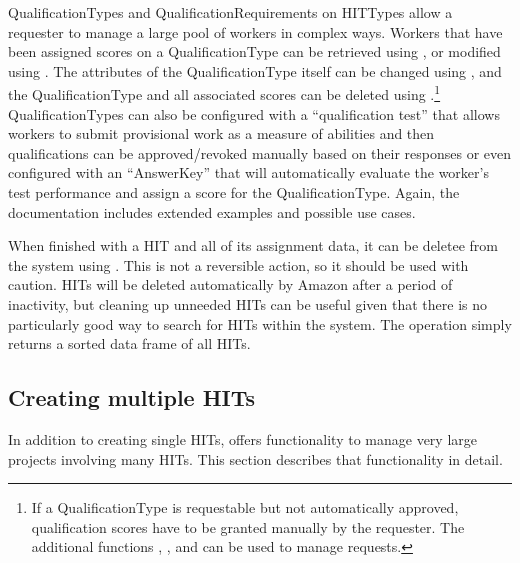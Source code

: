 QualificationTypes and QualificationRequirements on HITTypes allow a
requester to manage a large pool of workers in complex ways. Workers
that have been assigned scores on a QualificationType can be retrieved
using , or modified using
. The attributes of the
QualificationType itself can be changed using
, and the QualificationType and all
associated scores can be deleted using
.\footnote{If a QualificationType is
  requestable but not automatically approved, qualification scores
  have to be granted manually by the requester. The additional functions
  , , and
   can be used to manage requests.}
QualificationTypes can also be configured with a ``qualification
test'' that allows workers to submit provisional work as a measure of
abilities and then qualifications can be approved/revoked manually
based on their responses or even configured with an ``AnswerKey'' that
will automatically evaluate the worker's test performance and assign a
score for the QualificationType. Again, the  documentation
includes extended examples and possible use cases.

When finished with a HIT and all of its assignment data, it can be
deletee from the system using . This is not a
reversible action, so it should be used with caution. HITs will be
deleted automatically by Amazon after a period of inactivity, but
cleaning up unneeded HITs can be useful given that there is no
particularly good way to search for HITs within the system. The
 operation simply returns a sorted
data frame of all HITs.


\subsection{Creating multiple HITs}

In addition to creating single HITs,  offers functionality to manage very large projects involving many HITs. This section describes that functionality in detail.


